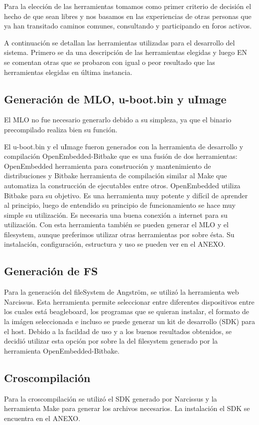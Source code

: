 Para la elección de las herramientas tomamos como primer criterio de decisión el hecho de que sean libres y nos basamos en las experiencias de otras personas que ya han transitado caminos comunes, consultando y participando en foros activos.

A continuación se detallan las herramientas utilizadas para el desarrollo del sistema. 
Primero se da una descripción de las herramientas elegidas y luego EN se comentan otras que se probaron con igual o peor resultado que las herramientas elegidas en última instancia.

\subsection{Generación de MLO, u-boot.bin y uImage}
El MLO no fue necesario generarlo debido a su simpleza, ya que el binario precompilado realiza bien su función.

El u-boot.bin y el uImage fueron generados con la herramienta de desarrollo y compilación OpenEmbedded-Bitbake que es una fusión de dos herramientas: OpenEmbedded herramienta para construcción y mantenimiento de distribuciones y Bitbake herramienta de compilación similar al Make que automatiza la construcción de ejecutables entre otros. OpenEmbedded utiliza Bitbake para su objetivo. Es una herramienta muy potente y difícil de aprender al principio, luego de entendido su principio de funcionamiento se hace muy simple su utilización. Es necesaria una buena conexión a internet para su utilización.
Con esta herramienta también se pueden generar el MLO y el filesystem, aunque preferimos utilizar otras herramientas por sobre ésta. 
Su instalación, configuración, estructura y uso se pueden ver en el ANEXO. 


\subsection{Generación de FS}
Para la generación del fileSystem de Angström, se utilizó la herramienta web Narcissus.
Esta herramienta permite seleccionar entre diferentes dispositivos entre los cuales está beagleboard, los programas que se quieran instalar, el formato de la imágen seleccionada e incluso se puede generar un kit de desarrollo (SDK) para el host. Debido a la facildad de uso y a los buenos resultados obtenidos, se decidió utilizar esta opción por sobre la del filesystem generado por la herramienta OpenEmbedded-Bitbake.


\subsection{Croscompilación}
Para la croscompilación se utilizó el SDK generado por Narcissus y la herramienta Make para generar los archivos necesarios. La instalación el SDK se encuentra en el ANEXO.


